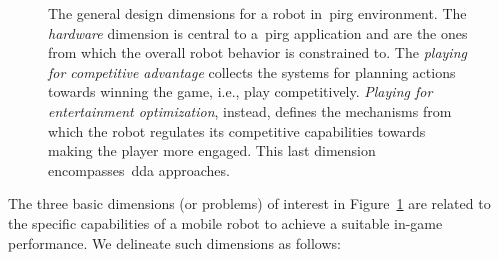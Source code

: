 \begin{figure}[h]
    \caption{The general design dimensions for a robot in~\gls{pirg} environment. The \textit{hardware} dimension is central to a~\gls{pirg} application and are the ones from which the overall robot behavior is constrained to. The \textit{playing for competitive advantage} collects the systems for planning actions towards winning the game, i.e., play competitively. \textit{Playing for entertainment optimization}, instead, defines the mechanisms from which the robot regulates its competitive capabilities towards making the player more engaged. This last dimension encompasses~\glsdesc{dda} approaches.}
    \label{graph:PIRG_design_structure}
\end{figure}

The three basic dimensions (or problems) of interest in Figure~\ref{graph:PIRG_design_structure} are related to the specific capabilities of a mobile robot to achieve a suitable in-game performance. We delineate such dimensions as follows:

